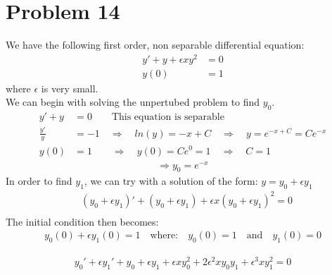 \documentclass[english,a4paper,12pt]{article}
\begin{document}
\section*{Problem 14}
We have the following first order, non separable differential equation:\\
\begin{align*}
y' + y + \epsilon x y^2 &= 0\\
y(0) &= 1
\end{align*}
where $\epsilon$ is very small.\\ 
We can begin with solving the unpertubed problem to find $y_0$.\\
\begin{align*}
y' + y &= 0 \qquad \text{This equation is separable}\\
\frac{y'}{y} &= -1 \quad \Rightarrow \quad ln(y) = -x + C \quad \Rightarrow \quad y= e^{-x + C}=Ce^{-x}\\
y(0) &= 1 \qquad \Rightarrow \quad y(0) = Ce^0 = 1 \quad \Rightarrow \quad C=1
\end{align*}
\begin{align*}
\Rightarrow y_0 = e^{-x}
\end{align*}
In order to find $y_1$, we can try with a solution of the form: $y = y_0 + \epsilon y_1$
\begin{align*}
&(y_0 + \epsilon y_1)' + (y_0 + \epsilon y_1) + \epsilon x (y_0 + \epsilon y_1)^2 = 0\\
\end{align*}
The initial condition then becomes:\\

\begin{align*}
y_0(0) + \epsilon y_1(0) = 1 \quad \text{where:} \quad y_0(0) = 1 \quad \text{and} \quad y_1(0) = 0
\end{align*}

\begin{align*}
y_0' + \epsilon y_1' + y_0 + \epsilon y_1 + \epsilon x y_0^2 + 2\epsilon^2 x y_0 y_1 + \epsilon^3 x y_1^2 = 0\\
\end{align*}
\end{document}
